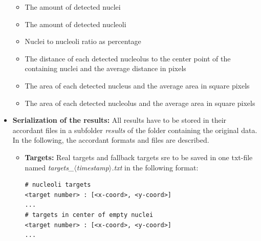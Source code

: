 \documentclass[a4paper, 11pt]{article}
\begin{document}
\begin{itemize}
\begin{itemize}
    \item The amount of detected nuclei
    \item The amount of detected nucleoli
    \item Nuclei to nucleoli ratio as percentage
    \item The distance of each detected nucleolus to the center point of the
    containing nuclei and the average distance in pixels
    \item The area of each detected nucleus and the average area in square
    pixels
    \item The area of each detected nucleolus and the average area in square
    pixels
  \end{itemize}
  \item \textbf{Serialization of the results:} All results have to be stored in
  their accordant files in a subfolder \textit{results} of the folder
  containing the original data. In the following, the accordant formats and
  files are described.
  \begin{itemize}
  	\item \textbf{Targets:} Real targets and fallback targets sre to be saved in
  	one txt-file named \textit{targets\_$\langle$timestamp$\rangle$.txt} in the
  	following format:
\begin{lstlisting}[frame=single, caption=Format of results txt-file]
# nucleoli targets
<target number> : [<x-coord>, <y-coord>]
...
# targets in center of empty nuclei
<target number> : [<x-coord>, <y-coord>]
...
\end{lstlisting}


\end{itemize}
\end{itemize}
\end{document}

